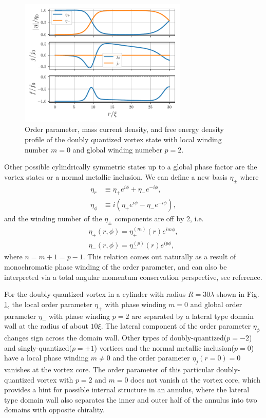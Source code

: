 \documentclass[aps,prb,reprint,groupedaddress]{revtex4-2}
\begin{document}
\begin{figure}
    \centering
    \includegraphics[width=8cm]{-p+ip_m=2.pdf}
    \caption{Order parameter, mass current density, and free energy
        density profile of the doubly quantized vortex state with local
        winding number $m=0$ and global winding numeber $p=2$.}
    \label{2vortex}
\end{figure}

Other possible cylindrically symmetric states up to
a global phase factor are the vortex states or a normal
metallic inclusion. We can define a new basis
$\eta_\pm$ where
\begin{align}
    \eta_r    & \equiv\eta_+e^{i\phi}+\eta_-e^{-i\phi},     \\
    \eta_\phi & \equiv i(\eta_+e^{i\phi}-\eta_-e^{-i\phi}),
\end{align}
and the winding number of the $\eta_\pm$ components are off by 2, i.e.
\begin{align}
    \eta_+(r,\phi)=\eta_+^{(m)}(r)e^{im\phi}, \\
    \eta_-(r,\phi)=\eta_-^{(p)}(r)e^{ip\phi},
\end{align}
where $n=m+1=p-1$. This relation comes out naturally as a result of monochromatic
phase winding of the order parameter, and can also be interpreted via a total angular
momentum conservation perspective, see reference\cite{sauls09}.

For the doubly-quantized vortex in a cylinder with radius $R=30\lambda$
shown in Fig. \ref{2vortex}, the local order
parameter $\eta_+$ with phase winding $m=0$ and global order parameter $\eta_-$ with
phase winding $p=2$ are separated by a lateral type domain wall at the radius of about
$10\xi$. The lateral component of the order parameter $\eta_\phi$ changes sign
across the domain wall. Other types of doubly-quantized($p=-2$) and
singly-quantized($p=\pm 1$) vortices and the normal metallic inclusion($p=0$) have a
local phase winding $m\neq 0$ and the order parameter $\eta_j(r=0)=0$ vanishes
at the vortex core\cite{sauls09}.
The order parameter of this particular doubly-quantized vortex
with $p=2$ and $m=0$ does not vanish at the vortex core, which provides a hint for
possible internal structure in an annulus, where the lateral type domain wall also
separates the inner and outer half of the annulus into two domains with opposite
chirality.
\end{document}
